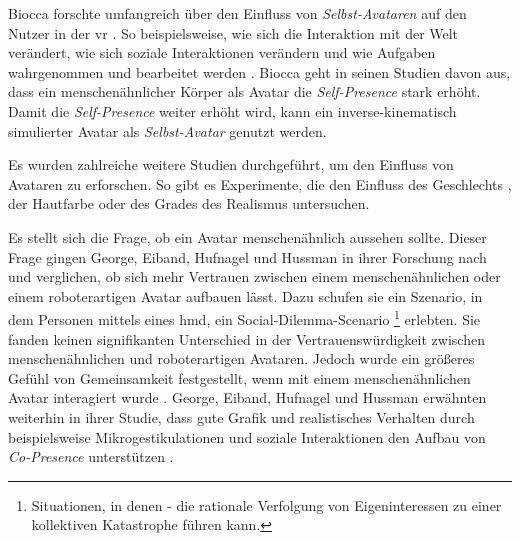 \documentclass[a4paper,11pt]{article}%
\renewcommand{\\}{\vspace*{0.5\baselineskip} \newline}
\begin{document}
Biocca forschte umfangreich über den Einfluss von \textit{Selbst-Avataren} auf den Nutzer in der \ac{vr} \citep[421-427]{construal2014connected}.
\newline So beispielsweise, wie sich die Interaktion mit der Welt verändert, wie sich soziale Interaktionen verändern und wie Aufgaben wahrgenommen und bearbeitet werden \citep{benford1995user} \citep{bowers1996talk}.
Biocca geht in seinen Studien davon aus, dass ein menschenähnlicher Körper als Avatar die \textit{Self-Presence} stark erhöht. Damit die \textit{Self-Presence} weiter erhöht wird, kann ein inverse-kinematisch simulierter Avatar als \textit{Selbst-Avatar} genutzt werden\citep[421-427]{construal2014connected}.


Es wurden zahlreiche weitere Studien durchgeführt, um den Einfluss von Avataren zu erforschen. So gibt es Experimente, die den Einfluss des Geschlechts \citep{slater2010first}, der Hautfarbe \citep{peck2013putting} oder des Grades des Realismus \citep{roth2016avatar} untersuchen.

Es stellt sich die Frage, ob ein Avatar menschenähnlich aussehen sollte. Dieser Frage gingen George, Eiband, Hufnagel und Hussman \citep{george2018trusting} in ihrer Forschung nach und verglichen, ob sich mehr Vertrauen zwischen einem menschenähnlichen oder einem roboterartigen Avatar aufbauen lässt.
Dazu schufen sie ein Szenario, in dem Personen mittels eines \ac{hmd}, ein Social-Dilemma-Scenario \footnote{Situationen, in denen - die rationale Verfolgung von Eigeninteressen zu einer kollektiven Katastrophe führen kann.} erlebten. Sie fanden keinen signifikanten Unterschied in der Vertrauenswürdigkeit zwischen menschenähnlichen und roboterartigen Avataren. Jedoch wurde ein größeres Gefühl von Gemeinsamkeit festgestellt, wenn mit einem menschenähnlichen Avatar interagiert wurde \citep{kerr1983motivation}.
George, Eiband, Hufnagel und Hussman erwähnten weiterhin in ihrer Studie, dass gute Grafik und realistisches Verhalten durch beispielsweise Mikrogestikulationen und soziale Interaktionen den Aufbau von \textit{Co-Presence} unterstützen \citep{george2018trusting}.
\end{document}
